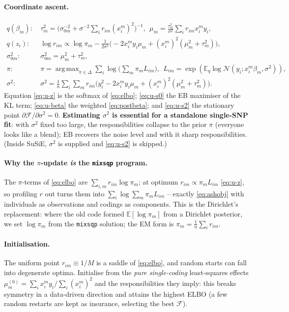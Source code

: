 \documentclass[11pt]{article}
\newcommand{\N}{\mathcal{N}}
\newcommand{\E}{\mathbb{E}}
\newcommand{\simplex}{\Delta}
\DeclareMathOperator*{\argmax}{arg\,max}
\begin{document}
\paragraph{Coordinate ascent.}
\begin{align}
q(\beta_m):\ &
\tau_m^2=\Big(\sigma_{0m}^{-2}+\sigma^{-2}\textstyle\sum_i r_{im}(x_i^m)^2\Big)^{-1},
\ \ \mu_m=\tfrac{\tau_m^2}{\sigma^2}\textstyle\sum_i r_{im}x_i^m y_i,
\label{eq:u-beta}\\
q(z_i):\ &
\log r_{im}\propto \log\pi_m
-\tfrac{1}{2\sigma^2}\big({-}2x_i^m y_i\mu_m+(x_i^m)^2(\mu_m^2+\tau_m^2)\big),
\label{eq:u-z}\\
\sigma_{0m}^2:\ & \sigma_{0m}^2=\mu_m^2+\tau_m^2,
\label{eq:u-s0}\\
\pi:\ &
\pi=\argmax_{\pi\in\simplex}\sum_i\log\big(\textstyle\sum_m \pi_m L_{im}\big),
\ \ L_{im}=\exp(\E_q\log\N(y_i;x_i^m\beta_m,\sigma^2)),
\label{eq:u-pi}\\
\sigma^2:\ &
\sigma^2=\tfrac1n\sum_i\sum_m r_{im}\big(y_i^2-2x_i^m y_i\mu_m+(x_i^m)^2(\mu_m^2+\tau_m^2)\big).
\label{eq:u-s2}
\end{align}
Equation \eqref{eq:u-z} is the softmax of \eqref{eq:elbo}; \eqref{eq:u-s0} the EB
maximiser of the KL term; \eqref{eq:u-beta} the weighted \eqref{eq:postbeta}; and
\eqref{eq:u-s2} the stationary point $\partial\mathcal F/\partial\sigma^2=0$.
\textbf{Estimating $\sigma^2$ is essential for a standalone single-SNP fit}: with
$\sigma^2$ fixed too large, the responsibilities collapse to the prior $\pi$
(everyone looks like a blend); EB recovers the noise level and with it sharp
responsibilities. (Inside SuSiE, $\sigma^2$ is supplied and \eqref{eq:u-s2} is
skipped.)

\paragraph{Why the $\pi$-update \emph{is} the \texttt{mixsqp} program.}
The $\pi$-terms of \eqref{eq:elbo} are $\sum_{i,m}r_{im}\log\pi_m$; at optimum
$r_{im}\propto\pi_m L_{im}$ \eqref{eq:u-z}, so profiling $r$ out turns them into
$\sum_i\log\sum_m\pi_m L_{im}$ -- exactly \eqref{eq:ashobj} with individuals as
observations and codings as components. This is the Dirichlet's replacement:
where the old code formed $\E[\log\pi_m]$ from a Dirichlet posterior, we set
$\log\pi_m$ from the \texttt{mixsqp} solution; the EM form is
$\pi_m=\tfrac1n\sum_i r_{im}$.

\paragraph{Initialisation.} The uniform point $r_{im}\equiv1/M$ is a saddle of
\eqref{eq:elbo}, and random starts can fall into degenerate optima. Initialise
from the \emph{pure single-coding} least-squares effects
$\mu_m^{(0)}=\sum_i x_i^m y_i/\sum_i(x_i^m)^2$ and the responsibilities they
imply: this breaks symmetry in a data-driven direction and attains the highest
ELBO (a few random restarts are kept as insurance, selecting the best
$\mathcal F$).
\end{document}

